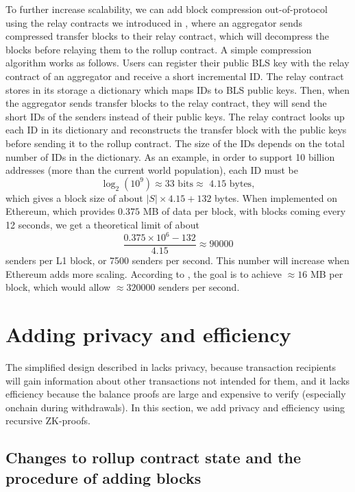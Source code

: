 To further increase scalability, we can add block compression
out-of-protocol using the relay contracts we introduced in
, where an aggregator sends compressed
transfer blocks to their relay contract, which will decompress the
blocks before relaying them to the rollup contract. A simple
compression algorithm works as follows. Users can register their
public BLS key with the relay contract of an aggregator and receive a
short incremental ID. The relay contract stores in its storage a
dictionary which maps IDs to BLS public keys. Then, when the
aggregator sends transfer blocks to the relay contract, they will
send the short IDs of the senders instead of their public keys. The
relay contract looks up each ID in its dictionary and reconstructs
the transfer block with the public keys before sending it to the
rollup contract. The size of the IDs depends on the total number of
IDs in the dictionary. As an example, in order to support 10 billion
addresses (more than the current world population), each ID must be
\[\log_2(10^9) \approx 33 \text{ bits} \approx \text{ 4.15 bytes},\]
which gives a block size of about \(|S| \times 4.15 + 132\) bytes.
When implemented on Ethereum, which provides \(0.375\) MB of data per
block\cite{eip4844}, with blocks coming every 12
seconds\cite{blocktime}, we get a theoretical limit of about
\[\frac{0.375 \times 10^6 - 132}{4.15} \approx 90000\] senders per L1
block, or 7500 senders per second. This number will increase when
Ethereum adds more scaling. According to \cite{eip4844}, the goal is
to achieve \(\approx 16\) MB per block, which would allow \(\approx
320000\) senders per second.

\section{Adding privacy and efficiency}\label{section:zk}

The simplified design described in 
lacks privacy, because transaction recipients will gain information
about other transactions not intended for them, and it lacks
efficiency because the balance proofs are large and expensive to
verify (especially onchain during withdrawals). In this section, we
add privacy and efficiency using recursive ZK-proofs.

\subsection{Changes to rollup contract state and the procedure of adding blocks}


